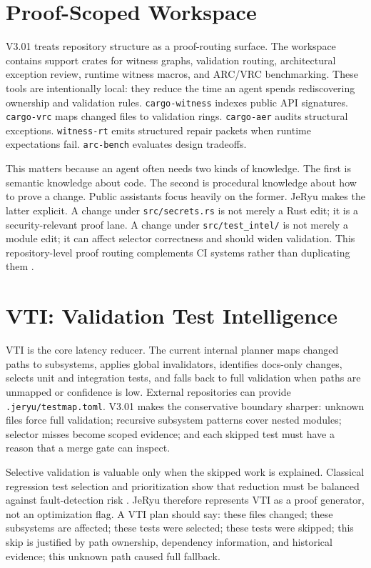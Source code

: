 \documentclass[conference]{IEEEtran}
\begin{document}
\section{Proof-Scoped Workspace}
V3.01 treats repository structure as a proof-routing surface. The workspace contains support crates for witness graphs, validation routing, architectural exception review, runtime witness macros, and ARC/VRC benchmarking. These tools are intentionally local: they reduce the time an agent spends rediscovering ownership and validation rules. \texttt{cargo-witness} indexes public API signatures. \texttt{cargo-vrc} maps changed files to validation rings. \texttt{cargo-aer} audits structural exceptions. \texttt{witness-rt} emits structured repair packets when runtime expectations fail. \texttt{arc-bench} evaluates design tradeoffs.

This matters because an agent often needs two kinds of knowledge. The first is semantic knowledge about code. The second is procedural knowledge about how to prove a change. Public assistants focus heavily on the former. JeRyu makes the latter explicit. A change under \texttt{src/secrets.rs} is not merely a Rust edit; it is a security-relevant proof lane. A change under \texttt{src/test\_intel/} is not merely a module edit; it can affect selector correctness and should widen validation. This repository-level proof routing complements CI systems rather than duplicating them \cite{gitlab-ci-docs,github-actions-docs}.

\section{VTI: Validation Test Intelligence}
VTI is the core latency reducer. The current internal planner maps changed paths to subsystems, applies global invalidators, identifies docs-only changes, selects unit and integration tests, and falls back to full validation when paths are unmapped or confidence is low. External repositories can provide \texttt{.jeryu/testmap.toml}. V3.01 makes the conservative boundary sharper: unknown files force full validation; recursive subsystem patterns cover nested modules; selector misses become scoped evidence; and each skipped test must have a reason that a merge gate can inspect.

Selective validation is valuable only when the skipped work is explained. Classical regression test selection and prioritization show that reduction must be balanced against fault-detection risk \cite{regression-test-selection-survey,safe-regression-test-selection,test-prioritization}. JeRyu therefore represents VTI as a proof generator, not an optimization flag. A VTI plan should say: these files changed; these subsystems are affected; these tests were selected; these tests were skipped; this skip is justified by path ownership, dependency information, and historical evidence; this unknown path caused full fallback.
\end{document}

